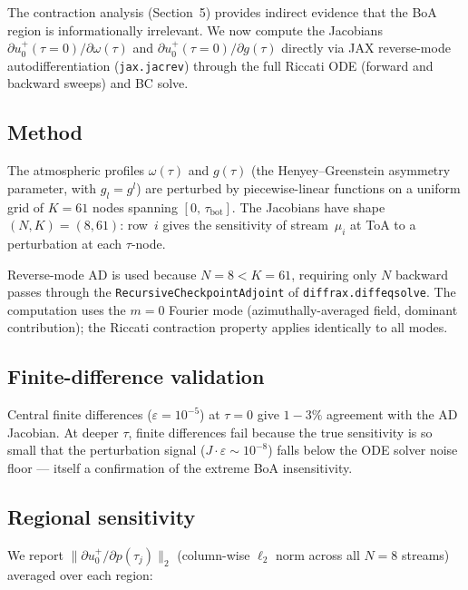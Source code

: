 \documentclass[11pt]{article}
\newcommand{\norm}[1]{\lVert #1 \rVert}
\begin{document}
The contraction analysis (Section~5) provides indirect evidence
that the BoA region is informationally irrelevant.  We now
compute the Jacobians
$\partial u^+_0(\tau\!=\!0)/\partial\omega(\tau)$ and
$\partial u^+_0(\tau\!=\!0)/\partial g(\tau)$ directly via
JAX reverse-mode autodifferentiation (\texttt{jax.jacrev})
through the full Riccati ODE (forward and backward sweeps)
and BC solve.

\subsection{Method}

The atmospheric profiles $\omega(\tau)$ and
$g(\tau)$ (the Henyey--Greenstein asymmetry parameter,
with $g_l = g^l$) are perturbed by
piecewise-linear functions on a uniform grid of $K=61$ nodes
spanning $[0,\,\tau_\mathrm{bot}]$.  The Jacobians have shape
$(N,K) = (8,61)$: row~$i$ gives the sensitivity of
stream~$\mu_i$ at ToA to a perturbation at each $\tau$-node.

Reverse-mode AD is used because $N=8 < K=61$, requiring only
$N$ backward passes through the \texttt{RecursiveCheckpointAdjoint}
of \texttt{diffrax.diffeqsolve}.  The computation uses the
$m=0$ Fourier mode (azimuthally-averaged field, dominant
contribution); the Riccati contraction property applies
identically to all modes.

\subsection{Finite-difference validation}

Central finite differences ($\varepsilon = 10^{-5}$) at $\tau=0$
give $1{-}3\%$ agreement with the AD Jacobian.  At deeper $\tau$,
finite differences fail because the true sensitivity is so small
that the perturbation signal ($J\cdot\varepsilon \sim 10^{-8}$)
falls below the ODE solver noise floor --- itself a confirmation
of the extreme BoA insensitivity.

\subsection{Regional sensitivity}

We report $\norm{\partial u^+_0 / \partial p(\tau_j)}_2$
(column-wise $\ell_2$ norm across all $N=8$ streams) averaged
over each region:
\end{document}
